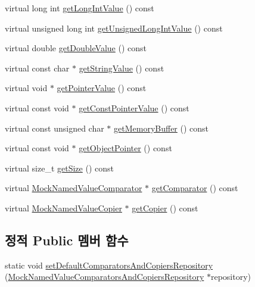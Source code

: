 \begin{DoxyCompactItemize}
virtual long int \hyperlink{class_mock_named_value_a80098b212ec47f46fbea65c4eeca921d}{get\+Long\+Int\+Value} () const 
\item 
virtual unsigned long int \hyperlink{class_mock_named_value_a9d8410affdf87ec6fbf90e0f70e1e894}{get\+Unsigned\+Long\+Int\+Value} () const 
\item 
virtual double \hyperlink{class_mock_named_value_acafefa2f258c976d04f0cd78e2a6ad2c}{get\+Double\+Value} () const 
\item 
virtual const char $\ast$ \hyperlink{class_mock_named_value_a6b3700ff1b64ad559094bb4ea0017353}{get\+String\+Value} () const 
\item 
virtual void $\ast$ \hyperlink{class_mock_named_value_a841cebf86eaad9de0cb3755466ae34be}{get\+Pointer\+Value} () const 
\item 
virtual const void $\ast$ \hyperlink{class_mock_named_value_a3e3eb7694ed79472dadc96359067e832}{get\+Const\+Pointer\+Value} () const 
\item 
virtual const unsigned char $\ast$ \hyperlink{class_mock_named_value_adad84e2750c749c1b58b68907d08fdda}{get\+Memory\+Buffer} () const 
\item 
virtual const void $\ast$ \hyperlink{class_mock_named_value_a4d4696a9a24da96598cfbe4865c23c66}{get\+Object\+Pointer} () const 
\item 
virtual size\+\_\+t \hyperlink{class_mock_named_value_af55b3790622878d65ed5ff2bb2b3fcc4}{get\+Size} () const 
\item 
virtual \hyperlink{class_mock_named_value_comparator}{Mock\+Named\+Value\+Comparator} $\ast$ \hyperlink{class_mock_named_value_ab38ffc6977031a9feb222165ad258089}{get\+Comparator} () const 
\item 
virtual \hyperlink{class_mock_named_value_copier}{Mock\+Named\+Value\+Copier} $\ast$ \hyperlink{class_mock_named_value_a40fe9225b38a6cf65b71ae55c5e581a8}{get\+Copier} () const 
\end{DoxyCompactItemize}
\subsection*{정적 Public 멤버 함수}
\begin{DoxyCompactItemize}
\item 
static void \hyperlink{class_mock_named_value_a3588b9134e06ada808cfc04a11fcc7a7}{set\+Default\+Comparators\+And\+Copiers\+Repository} (\hyperlink{class_mock_named_value_comparators_and_copiers_repository}{Mock\+Named\+Value\+Comparators\+And\+Copiers\+Repository} $\ast$repository)
\end{DoxyCompactItemize}
